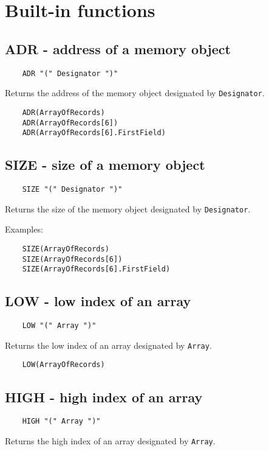 \section{Built-in functions}
\label{expr:builtin}

\subsection{ADR - address of a memory object}

\verb'    ADR "(" Designator ")"'

Returns the address of the memory object designated by \verb'Designator'.

\begin{verbatim}
    ADR(ArrayOfRecords)
    ADR(ArrayOfRecords[6])
    ADR(ArrayOfRecords[6].FirstField)
\end{verbatim}

\subsection{SIZE - size of a memory object}

\verb'    SIZE "(" Designator ")"'

Returns the size of the memory object designated by \verb'Designator'.

Examples:

\begin{verbatim}
    SIZE(ArrayOfRecords)
    SIZE(ArrayOfRecords[6])
    SIZE(ArrayOfRecords[6].FirstField)
\end{verbatim}


\subsection{LOW - low index of an array}

\verb'    LOW "(" Array ")"'

Returns the low index of an array designated by \verb'Array'.

\verb'    LOW(ArrayOfRecords)'

\subsection{HIGH - high index of an array}

\verb'    HIGH "(" Array ")"'

Returns the high index of an array designated by \verb'Array'.

